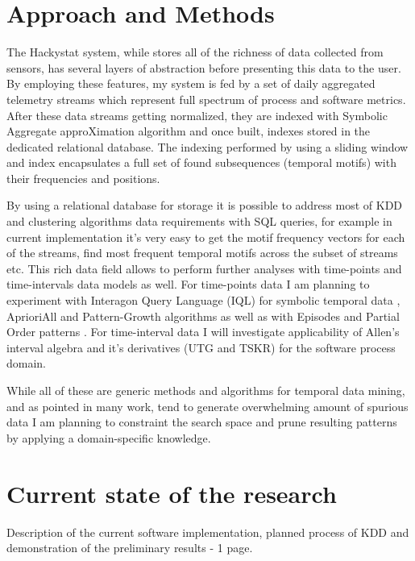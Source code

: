 \documentclass[11pt,oneside]{article}
\begin{document}
\section{Approach and Methods}
The Hackystat system, while stores all of the richness of data collected from sensors, has several layers of abstraction before presenting this data to the user. By employing these features, my system is fed by a set of daily aggregated telemetry streams which represent full spectrum of process and software metrics. After these data streams getting normalized, they are indexed with Symbolic Aggregate approXimation algorithm \cite{citeulike:2821475} and once built, indexes stored in the dedicated relational database. The indexing performed by using a sliding window and index encapsulates a full set of found subsequences (temporal motifs) with their frequencies and positions. 

By using a relational database for storage it is possible to address most of KDD and clustering algorithms data requirements with SQL queries, for example in current implementation it's very easy to get the motif frequency vectors for each of the streams, find most frequent temporal motifs across the subset of streams etc. This rich data field allows to perform further analyses with time-points and time-intervals data models as well. For time-points data I am planning to experiment with Interagon Query Language (IQL) for symbolic temporal data \cite{citeulike:5043086}, AprioriAll \cite{citeulike:775528} and Pattern-Growth algorithms \cite{citeulike:5043097} as well as with Episodes \cite{citeulike:5043099} and Partial Order patterns \cite{citeulike:5043101}. For time-interval data I will investigate applicability of Allen's interval algebra \cite{citeulike:191348} and it's derivatives (UTG \cite{citeulike:5043086} and TSKR\cite{citeulike:3978076}) for the software process domain. 

While all of these are generic methods and algorithms for temporal data mining, and as pointed in many work, tend to generate overwhelming amount of spurious data I am planning to constraint the search space and prune resulting patterns by applying a domain-specific knowledge.

\section{Current state of the research}
Description of the current software implementation, planned process of KDD and demonstration of the preliminary results - 1 page.
\end{document}
